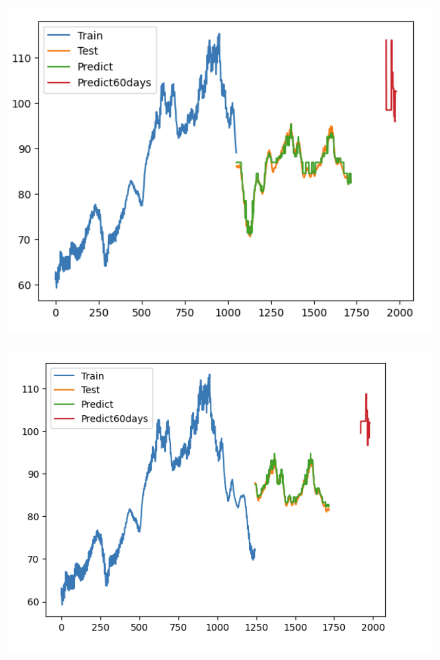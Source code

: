 \documentclass{article}
\begin{document}
\begin{multicols}{2}
\begin{figure}[H]
    \centering
    \begin{minipage}{0.15\textwidth}
    \centering
    \includegraphics[width=1\textwidth]{Image/Light GBM/SN_6_4_60.png}
   
    \label{fig:1}
    \end{minipage}%
    \begin{minipage}{0.15\textwidth}
    \centering
    \includegraphics[width=1\textwidth]{Image/Light GBM/SN_7_3_60.png}
  

\end{minipage}
\end{figure}
\end{multicols}
\end{document}
